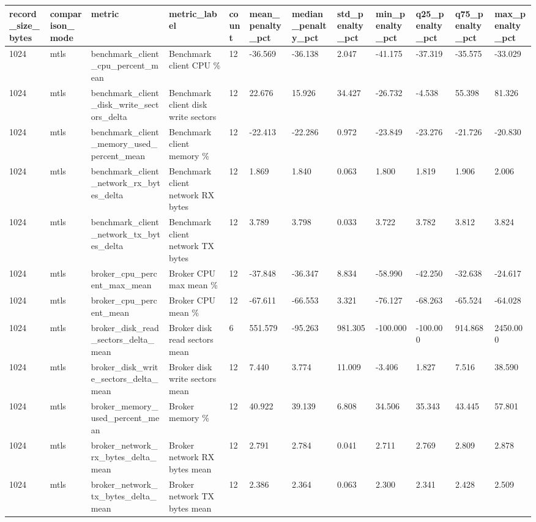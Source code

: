 \begin{longtable}{llllllllllll}
\hline
record\_size\_bytes & comparison\_mode & metric & metric\_label & count & mean\_penalty\_pct & median\_penalty\_pct & std\_penalty\_pct & min\_penalty\_pct & q25\_penalty\_pct & q75\_penalty\_pct & max\_penalty\_pct \\
\hline
1024 & mtls & benchmark\_client\_cpu\_percent\_mean & Benchmark client CPU \% & 12 & -36.569 & -36.138 & 2.047 & -41.175 & -37.319 & -35.575 & -33.029 \\
1024 & mtls & benchmark\_client\_disk\_write\_sectors\_delta & Benchmark client disk write sectors & 12 & 22.676 & 15.926 & 34.427 & -26.732 & -4.538 & 55.398 & 81.326 \\
1024 & mtls & benchmark\_client\_memory\_used\_percent\_mean & Benchmark client memory \% & 12 & -22.413 & -22.286 & 0.972 & -23.849 & -23.276 & -21.726 & -20.830 \\
1024 & mtls & benchmark\_client\_network\_rx\_bytes\_delta & Benchmark client network RX bytes & 12 & 1.869 & 1.840 & 0.063 & 1.800 & 1.819 & 1.906 & 2.006 \\
1024 & mtls & benchmark\_client\_network\_tx\_bytes\_delta & Benchmark client network TX bytes & 12 & 3.789 & 3.798 & 0.033 & 3.722 & 3.782 & 3.812 & 3.824 \\
1024 & mtls & broker\_cpu\_percent\_max\_mean & Broker CPU max mean \% & 12 & -37.848 & -36.347 & 8.834 & -58.990 & -42.250 & -32.638 & -24.617 \\
1024 & mtls & broker\_cpu\_percent\_mean & Broker CPU mean \% & 12 & -67.611 & -66.553 & 3.321 & -76.127 & -68.263 & -65.524 & -64.028 \\
1024 & mtls & broker\_disk\_read\_sectors\_delta\_mean & Broker disk read sectors mean & 6 & 551.579 & -95.263 & 981.305 & -100.000 & -100.000 & 914.868 & 2450.000 \\
1024 & mtls & broker\_disk\_write\_sectors\_delta\_mean & Broker disk write sectors mean & 12 & 7.440 & 3.774 & 11.009 & -3.406 & 1.827 & 7.516 & 38.590 \\
1024 & mtls & broker\_memory\_used\_percent\_mean & Broker memory \% & 12 & 40.922 & 39.139 & 6.808 & 34.506 & 35.343 & 43.445 & 57.801 \\
1024 & mtls & broker\_network\_rx\_bytes\_delta\_mean & Broker network RX bytes mean & 12 & 2.791 & 2.784 & 0.041 & 2.711 & 2.769 & 2.809 & 2.878 \\
1024 & mtls & broker\_network\_tx\_bytes\_delta\_mean & Broker network TX bytes mean & 12 & 2.386 & 2.364 & 0.063 & 2.300 & 2.341 & 2.428 & 2.509 \\

\end{longtable}

